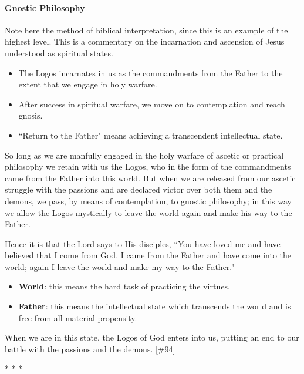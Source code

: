 \paragraph{Gnostic Philosophy}
Note here the method of biblical interpretation, since this is an example of the highest level. This is a commentary on
the incarnation and ascension of Jesus understood as spiritual states.

\begin{itemize}
\item The Logos incarnates in us as the commandments from the Father to the extent that we engage in holy warfare. 
\item After success in spiritual warfare, we move on to contemplation and reach gnosis. 
\item ``Return to the Father" means achieving a transcendent intellectual state. 
\end{itemize}
\begin{quotex}
So long as we are manfully engaged in the holy warfare of ascetic or practical philosophy we retain with us the Logos,
who in the form of the commandments came from the Father into this world. But when we are released from our ascetic
struggle with the passions and are declared victor over both them and the demons, we pass, by means of contemplation,
to gnostic philosophy; in this way we allow the Logos mystically to leave the world again and make his way to the
Father.

Hence it is that the Lord says to His disciples, ``You have loved me and have believed that I come from God. I came from
the Father and have come into the world; again I leave the world and make my way to the Father."

\begin{itemize}
\item\textbf{World}: this means the hard task of practicing the virtues. 
\item\textbf{Father}: this means the intellectual state which transcends the world and is free from all material propensity. 
\end{itemize}
When we are in this state, the Logos of God enters into us, putting an end to our battle with the passions and the
demons. [\#94] 

\end{quotex}



\begin{center}* * *\end{center}

